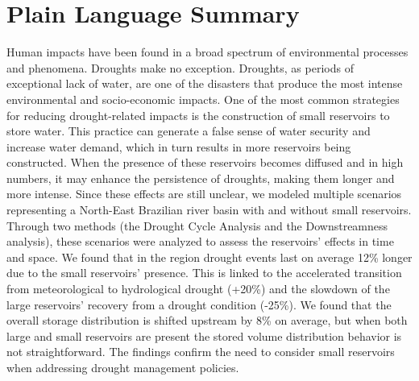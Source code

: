 \documentclass[draft]{agujournal2019}
\begin{document}
\section*{Plain Language Summary}
Human impacts have been found in a broad spectrum of environmental processes and phenomena. Droughts make no exception. Droughts, as periods of exceptional lack of water, are one of the disasters that produce the most intense environmental and socio-economic impacts. One of the most common strategies for reducing drought-related impacts is the construction of small reservoirs to store water. This practice can generate a false sense of water security and increase water demand, which in turn results in more reservoirs being constructed. When the presence of these reservoirs becomes diffused and in high numbers, it may enhance the persistence of droughts, making them longer and more intense. Since these effects are still unclear, we modeled multiple scenarios representing a North-East Brazilian river basin with and without small reservoirs. Through two methods (the Drought Cycle Analysis and the Downstreamness analysis), these scenarios were analyzed to assess the reservoirs’ effects in time and space. We found that in the region drought events last on average 12\% longer due to the small reservoirs’ presence. This is linked to the accelerated transition from meteorological to hydrological drought (+20\%) and the slowdown of the large reservoirs’ recovery from a drought condition (-25\%). We found that the overall storage distribution is shifted upstream by 8\% on average, but when both large and small reservoirs are present the stored volume distribution behavior is not straightforward. The findings confirm the need to consider small reservoirs when addressing drought management policies.


%
%

%

\end{document}
